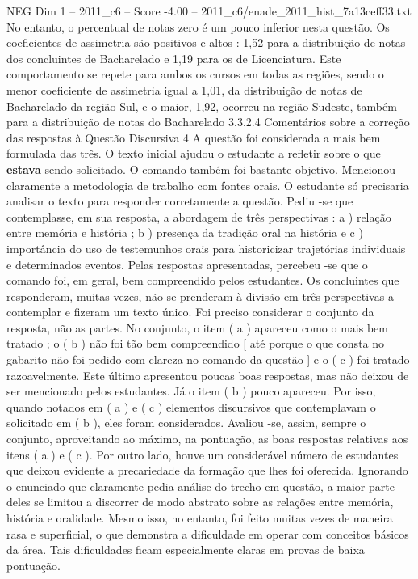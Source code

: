 \begin{textsample}{NEG Dim 1 – 2011\_c6 – Score -4.00 – 2011\_c6/enade\_2011\_hist\_7a13ceff33.txt}
No entanto, o percentual de notas zero é um pouco inferior nesta questão.
Os coeficientes de assimetria são positivos e altos : 1,52 para a distribuição de notas dos concluintes de Bacharelado e 1,19 para os de Licenciatura.
Este comportamento se repete para ambos os cursos em todas as regiões, sendo o menor coeficiente de assimetria igual a 1,01, da distribuição de notas de Bacharelado da região Sul, e o maior, 1,92, ocorreu na região Sudeste, também para a distribuição de notas do Bacharelado 3.3.2.4 Comentários sobre a correção das respostas à Questão Discursiva 4 A questão foi considerada a mais bem formulada das três.
O texto inicial ajudou o estudante a refletir sobre o que \textbf{estava} sendo solicitado.
O comando também foi bastante objetivo.
Mencionou claramente a metodologia de trabalho com fontes orais.
O estudante só precisaria analisar o texto para responder corretamente a questão.
Pediu -se que contemplasse, em sua resposta, a abordagem de três perspectivas : a ) relação entre memória e história ; b ) presença da tradição oral na história e c ) importância do uso de testemunhos orais para historicizar trajetórias individuais e determinados eventos.
Pelas respostas apresentadas, percebeu -se que o comando foi, em geral, bem compreendido pelos estudantes.
Os concluintes que responderam, muitas vezes, não se prenderam à divisão em três perspectivas a contemplar e fizeram um texto único.
Foi preciso considerar o conjunto da resposta, não as partes.
No conjunto, o item ( a ) apareceu como o mais bem tratado ; o ( b ) não foi tão bem compreendido [ até porque o que consta no gabarito não foi pedido com clareza no comando da questão ] e o ( c ) foi tratado razoavelmente.
Este último apresentou poucas boas respostas, mas não deixou de ser mencionado pelos estudantes.
Já o item ( b ) pouco apareceu.
Por isso, quando notados em ( a ) e ( c ) elementos discursivos que contemplavam o solicitado em ( b ), eles foram considerados.
Avaliou -se, assim, sempre o conjunto, aproveitando ao máximo, na pontuação, as boas respostas relativas aos itens ( a ) e ( c ).
Por outro lado, houve um considerável número de estudantes que deixou evidente a precariedade da formação que lhes foi oferecida.
Ignorando o enunciado que claramente pedia análise do trecho em questão, a maior parte deles se limitou a discorrer de modo abstrato sobre as relações entre memória, história e oralidade.
Mesmo isso, no entanto, foi feito muitas vezes de maneira rasa e superficial, o que demonstra a dificuldade em operar com conceitos básicos da área.
Tais dificuldades ficam especialmente claras em provas de baixa pontuação.

\end{textsample}
